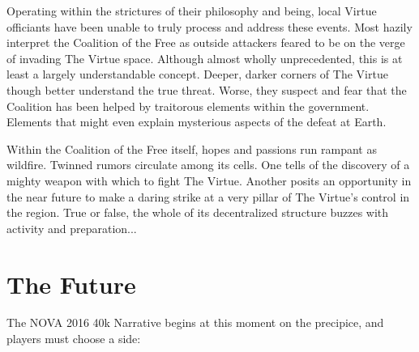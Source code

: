 \documentclass{novanarrative}
\begin{document}
Operating within the strictures of their philosophy and being, local
Virtue officiants have been unable to truly process and address these
events.  Most hazily interpret the Coalition of the Free as outside
attackers feared to be on the verge of invading The Virtue space.
Although almost wholly unprecedented, this is at least a largely
understandable concept.  Deeper, darker corners of The Virtue though
better understand the true threat.  Worse, they suspect and fear that
the Coalition has been helped by traitorous elements within the
government.  Elements that might even explain mysterious aspects of
the defeat at Earth.

Within the Coalition of the Free itself, hopes and passions run
rampant as wildfire.  Twinned rumors circulate among its cells.  One
tells of the discovery of a mighty weapon with which to fight The
Virtue.  Another posits an opportunity in the near future to make a
daring strike at a very pillar of The Virtue's control in the
region.  True or false, the whole of its decentralized structure
buzzes with activity and preparation...

\section{The Future}

The NOVA 2016 40k Narrative begins at this moment on the precipice,
and players must choose a side:
\end{document}
